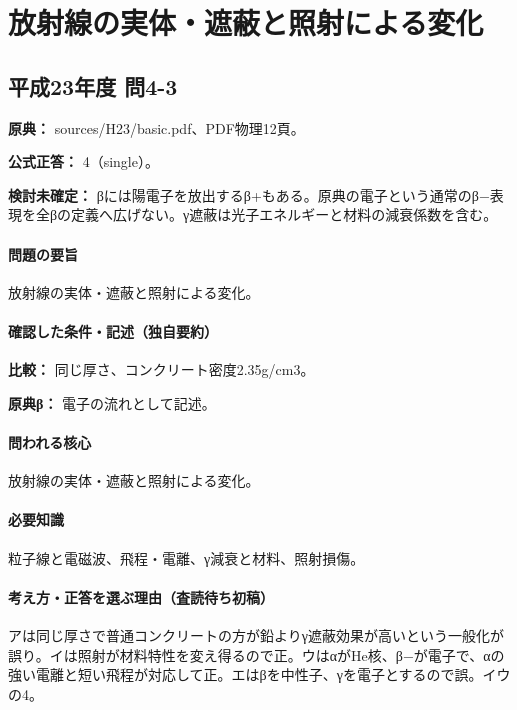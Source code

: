 \section{放射線の実体・遮蔽と照射による変化}

\subsection{平成23年度 問4-3}
\label{q:h23-reg-basic-4-3}

\noindent\textbf{原典：} sources/H23/basic.pdf、PDF物理12頁。

\textbf{公式正答：} 4（single）。

\par\textbf{検討未確定：} βには陽電子を放出するβ+もある。原典の電子という通常のβ−表現を全βの定義へ広げない。γ遮蔽は光子エネルギーと材料の減衰係数を含む。

\paragraph{問題の要旨} 放射線の実体・遮蔽と照射による変化。

\paragraph{確認した条件・記述（独自要約）}\mbox{}\par

\noindent\textbf{比較：} 同じ厚さ、コンクリート密度2.35g/cm3。\par

\noindent\textbf{原典β：} 電子の流れとして記述。\par

\paragraph{問われる核心} 放射線の実体・遮蔽と照射による変化。

\paragraph{必要知識} 粒子線と電磁波、飛程・電離、γ減衰と材料、照射損傷。

\paragraph{考え方・正答を選ぶ理由（査読待ち初稿）} アは同じ厚さで普通コンクリートの方が鉛よりγ遮蔽効果が高いという一般化が誤り。イは照射が材料特性を変え得るので正。ウはαがHe核、β−が電子で、αの強い電離と短い飛程が対応して正。エはβを中性子、γを電子とするので誤。イウの4。

